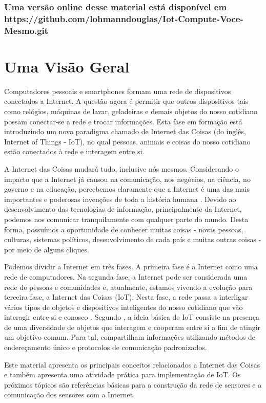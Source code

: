\subsection*{\center \normalsize Uma versão online desse material está disponível em https://github.com/lohmanndouglas/Iot-Compute-Voce-Mesmo.git }


%

%
\tableofcontents
%
\mainmatter

\chapter{Uma Visão Geral}
Computadores pessoais e smartphones formam uma rede de dispositivos conectados a Internet. A questão agora é permitir  que outros dispositivos tais como relógios, máquinas de lavar, geladeiras e demais objetos do nosso cotidiano possam conectar-se a rede e trocar informações. Esta fase em formação está introduzindo um novo paradigma chamado de Internet das Coisas (do inglês, Internet of Things - IoT), no qual pessoas, animais e coisas do nosso cotidiano estão conectados à rede e interagem entre si.


A Internet das Coisas mudará tudo, inclusive nós mesmos. Considerando o impacto que a Internet já causou na comunicação, nos negócios, na ciência, no governo e na educação, percebemos claramente que a Internet é uma das mais importantes e poderosas invenções de toda a história humana \cite{daveevans2011}. Devido ao desenvolvimento das tecnologias de informação, principalmente da Internet, podemos nos comunicar tranquilamente com qualquer parte do mundo. Desta forma, possuímos a oportunidade de conhecer muitas coisas - novas pessoas, culturas, sistemas políticos, desenvolvimento de cada país e muitas outras coisas - por meio de alguns cliques. 


Podemos dividir a Internet em três fases. A primeira fase é a Internet como uma rede de computadores. Na segunda fase, a Internet pode ser considerada uma rede de pessoas e comunidades e, atualmente, estamos vivendo a evolução para terceira fase, a Internet das Coisas (IoT). Nesta fase, a rede passa a interligar vários tipos de objetos e dispositivos inteligentes do nosso cotidiano que vão interagir entre si e conosco \cite{nicbr}.
Segundo \cite{atzori2010internet}, a ideia básica de IoT consiste na presença de uma diversidade de  objetos que interagem e cooperam entre si a fim de atingir um objetivo comum. Para tal, compartilham informações utilizando métodos de endereçamento único e protocolos de comunicação padronizados. 

Este material apresenta os principais conceitos relacionados a Internet das Coisas e também apresenta uma atividade prática para implementação de IoT. Os próximos tópicos são referências básicas para a construção da rede de sensores e a comunicação dos sensores com a Internet. 
